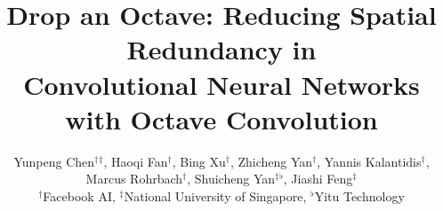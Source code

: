 \documentclass[10pt,twocolumn,letterpaper]{article}
\newcommand{\hiConvName}[0]{Octave Convolution\xspace}
\begin{document}
\title{Drop an Octave: Reducing Spatial Redundancy in \\ Convolutional Neural Networks with \hiConvName}

\author{
  Yunpeng Chen$^\dagger$$^\ddagger$, Haoqi Fan$^\dagger$, Bing Xu$^\dagger$, Zhicheng Yan$^\dagger$, Yannis Kalantidis$^\dagger$, \\
  Marcus Rohrbach$^\dagger$, Shuicheng Yan$^\ddagger$$^\flat$, Jiashi Feng$^\ddagger$ \\
  $^\dagger$Facebook AI, $^\ddagger$National University of Singapore, $^\flat$Yitu Technology \\
}


\maketitle

















{\small


}

\newpage
\setcounter{section}{0}
\setcounter{subsection}{0}



\end{document}
